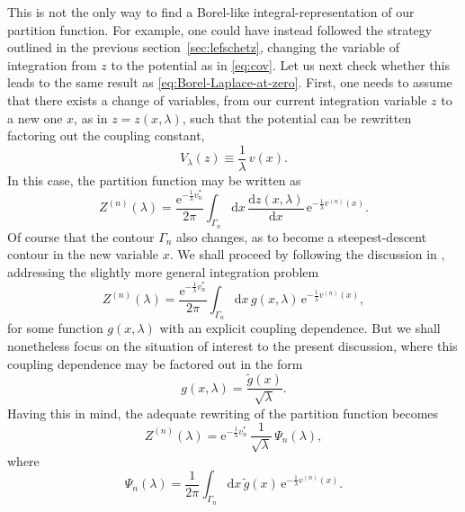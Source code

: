 \documentclass[11pt,a4paper]{article}
\newcommand{\be}{\begin{equation}}
\newcommand{\ee}{\end{equation}}
\newcommand{\rme}{{\mathrm{e}}}
\newcommand{\rmd}{{\mathrm{d}}}
\begin{document}
This is not the only way to find a Borel-like integral-representation of our partition function. For example, one could have instead followed the strategy outlined in the previous section~\ref{sec:lefschetz}, changing the variable of integration from $z$ to the potential as in \eqref{eq:cov}. Let us next check whether this leads to the same result as \eqref{eq:Borel-Laplace-at-zero}. First, one needs to assume that there exists a change of variables, from our current integration variable $z$ to a new one $x$, as in $z=z(x,\lambda)$, such that the potential can be rewritten factoring out the coupling constant,
%
\begin{equation}
V_\lambda (z) \equiv \frac{1}{\lambda}\, v (x).
\end{equation}
%
\noindent
In this case, the partition function may be written as
%
\begin{equation}
Z^{(n)} (\lambda) = \frac{\rme^{- \frac{1}{\lambda} v^*_n}}{2\pi} \int_{\Gamma_{n}} \rmd x\,\frac{\rmd z (x,\lambda)}{\rmd x}\, \rme^{- \frac{1}{\lambda} v^{(n)} (x)}.
\end{equation}
%
\noindent
Of course that the contour $\Gamma_n$ also changes, as to become a steepest-descent contour in the new variable $x$. We shall proceed by following the discussion in \cite{bh91}, addressing the slightly more general integration problem
%
\begin{equation}
\label{eq:Partition-function-with Sn(x)}
Z^{(n)} (\lambda) = \frac{\rme^{- \frac{1}{\lambda} v^*_n}}{2\pi} \int_{\Gamma_{n}} \rmd x\, g (x,\lambda)\, \rme^{- \frac{1}{\lambda} v^{(n)} (x)},
\end{equation}
%
\noindent
for some function $g (x,\lambda)$ with an explicit coupling dependence. But we shall nonetheless focus on the situation of interest to the present discussion, where this coupling dependence may be factored out in the form
%
\begin{equation}
g(x,\lambda)=\frac{\widetilde{g}(x)}{\sqrt{\lambda}}.
\end{equation}
%
\noindent
Having this in mind, the adequate rewriting of the partition function becomes
%
\begin{equation}
\label{Psidefinition}
Z^{(n)} (\lambda) = \rme^{- \frac{1}{\lambda} v^*_n}\, \frac{1}{\sqrt{\lambda}}\, \Psi_{n} (\lambda),
\end{equation}
%
\noindent
where
%
\be
\label{Psiintegration}
\Psi_{n} (\lambda) = \frac{1}{2\pi} \int_{\Gamma_n} \rmd x\, \widetilde{g}(x)\, \rme^{- \frac{1}{\lambda} v^{(n)} (x)}.
\ee
\end{document}
